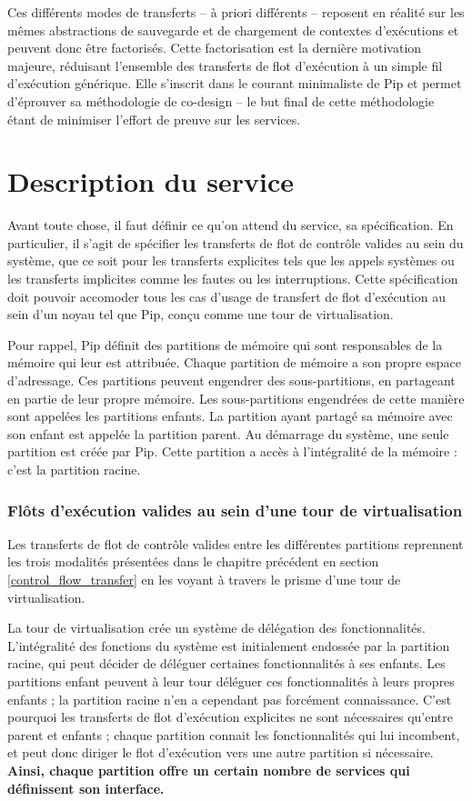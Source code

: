 		Ces différents modes de transferts -- à priori différents -- reposent en réalité sur les mêmes abstractions de sauvegarde et de chargement de contextes d'exécutions et peuvent donc être factorisés. Cette factorisation est la dernière motivation majeure, réduisant l'ensemble des transferts de flot d'exécution à un simple fil d'exécution générique. Elle s'inscrit dans le courant minimaliste de Pip et permet d'éprouver sa méthodologie de co-design -- le but final de cette méthodologie étant de minimiser l'effort de preuve sur les services.

	\section{Description du service}
	\label{sec:service_desc}

	Avant toute chose, il faut définir ce qu'on attend du service, sa spécification. En particulier, il s'agit de spécifier les transferts de flot de contrôle valides au sein du système, que ce soit pour les transferts explicites tels que les appels systèmes ou les transferts implicites comme les fautes ou les interruptions. Cette spécification doit pouvoir accomoder tous les cas d'usage de transfert de flot d'exécution au sein d'un noyau tel que Pip, conçu comme une tour de virtualisation.
	
	Pour rappel, Pip définit des partitions de mémoire qui sont responsables de la mémoire qui leur est attribuée. Chaque partition de mémoire a son propre espace d'adressage. Ces partitions peuvent engendrer des sous-partitions, en partageant en partie de leur propre mémoire. Les sous-partitions engendrées de cette manière sont appelées les partitions enfants. La partition ayant partagé sa mémoire avec son enfant est appelée la partition parent. Au démarrage du système, une seule partition est créée par Pip. Cette partition a accès à l'intégralité de la mémoire : c'est la partition racine.

	\subsubsection{Flôts d'exécution valides au sein d'une tour de virtualisation}

	Les transferts de flot de contrôle valides entre les différentes partitions reprennent les trois modalités présentées dans le chapitre précédent en section \ref{control_flow_transfer} en les voyant à travers le prisme d'une tour de virtualisation.

	La tour de virtualisation crée un système de délégation des fonctionnalités. L'intégralité des fonctions du système est initialement endossée par la partition racine, qui peut décider de déléguer certaines fonctionnalités à ses enfants. Les partitions enfant peuvent à leur tour déléguer ces fonctionnalités à leurs propres enfants ; la partition racine n'en a cependant pas forcément connaissance. C'est pourquoi les transferts de flot d'exécution explicites ne sont nécessaires qu'entre parent et enfants ; chaque partition connait les fonctionnalités qui lui incombent, et peut donc diriger le flot d'exécution vers une autre partition si nécessaire. \textbf{Ainsi, chaque partition offre un certain nombre de services qui définissent son interface.}

